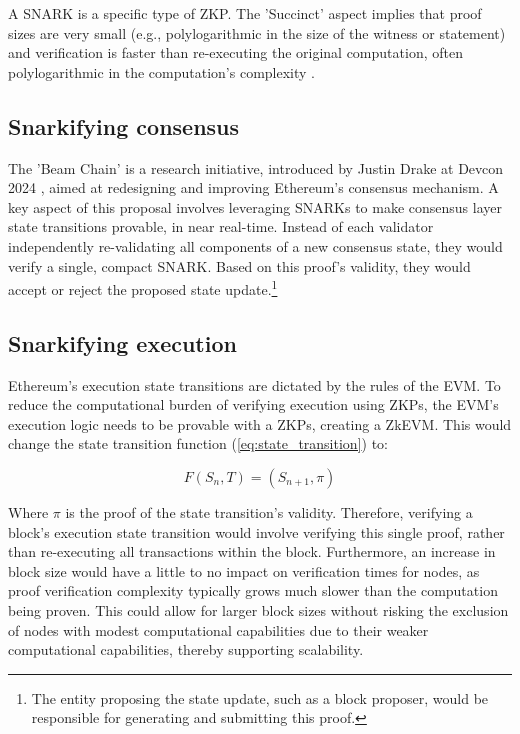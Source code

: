 A SNARK is a specific type of ZKP. The 'Succinct' aspect implies that proof
sizes are very small (e.g., polylogarithmic in the size of the witness or
statement) and verification is faster than re-executing the original
computation, often polylogarithmic in the computation's complexity \cite{BCCT11}.

\subsection{Snarkifying consensus}

The 'Beam Chain' is a research initiative, introduced by Justin Drake at Devcon
2024 \cite{JustinDrakeBeamchain}, aimed at redesigning and improving
Ethereum's consensus mechanism. A key aspect of this proposal involves
leveraging SNARKs to make consensus layer state transitions provable, in near
real-time. Instead of each validator independently re-validating all
components of a new consensus state, they would verify a single, compact
SNARK. Based on this proof's validity, they would accept or
reject the proposed state update.\footnote{The entity proposing the state
update, such as a block proposer, would be responsible for generating and
submitting this proof.}

\subsection{Snarkifying execution}

Ethereum's execution state transitions are dictated by the rules of the
EVM. To reduce the computational burden of verifying execution using ZKPs, the
EVM's execution logic needs to be provable with a ZKPs, creating a ZkEVM. This
would change the state transition function (\ref{eq:state_transition}) to:

\[
	F(S_n, T) = (S_{n+1}, \pi)
\]

Where $\pi$ is the proof of the state transition's validity. Therefore,
verifying a block's execution state transition would involve verifying this
single proof, rather than re-executing all transactions within the block.
Furthermore, an increase in block size would have a little to no impact on
verification times for nodes, as proof verification complexity typically grows
much slower than the computation being proven. This could allow for larger
block sizes without risking the exclusion of nodes with modest computational
capabilities due to their weaker computational capabilities, thereby
supporting scalability.

